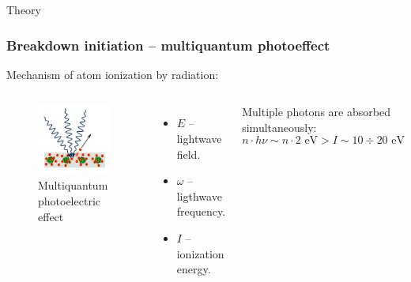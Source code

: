 \documentclass{beamer}
\begin{document}
	
	\begin{frame}[plain,c]
		
		\begin{center}
			\huge {} Theory
		\end{center}
		
	\end{frame}
	
	\begin{frame}
		\frametitle{Breakdown initiation -- multiquantum photoeffect}
		Mechanism of atom ionization by radiation:
		\begin{columns}
			\begin{figure}
				\centering
				\includegraphics[width=0.7\linewidth]{res/multiphoton.png}
				\caption*{Multiquantum photoelectric effect}
			\end{figure}
			
			\begin{itemize}
				\setlength\itemsep{-2pt}
				\item $E$ -- lightwave field.
				\item $\omega$ -- ligthwave frequency.
				\item $I$ -- ionization energy.
			\end{itemize}
			
			Multiple photons are absorbed simultaneously:
			$$ n \cdot h\nu \sim n \cdot 2 \text{ eV} > I \sim 10\div20 \text{ eV}$$
		\end{columns}
	
		
		
	\end{frame}
	
\end{document}
